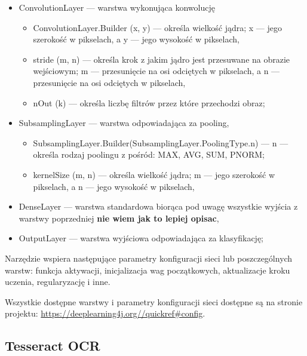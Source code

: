 \documentclass[a4paper,12pt]{article}
\begin{document}
			\begin{spacing}{1.5}
				\begin{itemize}
					\item ConvolutionLayer --- warstwa wykonująca konwolucję
						\begin{itemize}
							\item ConvolutionLayer.Builder (x, y) --- określa wielkość jądra; x --- jego szerokość w pikselach, a y --- jego wysokość w pikselach,
							\item stride (m, n) --- określa krok z jakim jądro jest przesuwane na obrazie wejściowym; m --- przesunięcie na osi odciętych w pikselach, 
								a n --- przesunięcie na osi odciętych w pikselach,
							\item nOut (k) --- określa liczbę filtrów przez które przechodzi obraz;
						\end{itemize}
					\item SubsamplingLayer --- warstwa odpowiadająca za pooling,
						\begin{itemize}
							\item SubsamplingLayer.Builder(SubsamplingLayer.PoolingType.n) --- n --- określa rodzaj poolingu z pośród: MAX, AVG, SUM, PNORM; 
							\item kernelSize (m, n) --- określa wielkość jądra; m --- jego szerokość w pikselach, a n --- jego wysokość w pikselach,
						\end{itemize}
					\item DenseLayer --- warstwa standardowa biorąca pod uwagę wszystkie wyjścia z warstwy poprzedniej \textbf{nie wiem jak to lepiej opisac},
					\item OutputLayer --- warstwa wyjściowa odpowiadająca za klasyfikację;
				\end{itemize}
			\end{spacing}
			
		\par Narzędzie wspiera następujące parametry konfiguracji sieci lub poszczególnych warstw: funkcja aktywacji, inicjalizacja wag początkowych, 
			aktualizacje kroku uczenia, regularyzację i inne.
        
        \par Wszystkie dostępne warstwy i parametry konfiguracji sieci dostępne są na stronie projektu:
			\href{https://deeplearning4j.org//quickref\#config}{\url{https://deeplearning4j.org//quickref\#config}}.
        
	\subsection{Tesseract OCR}
\end{document}
